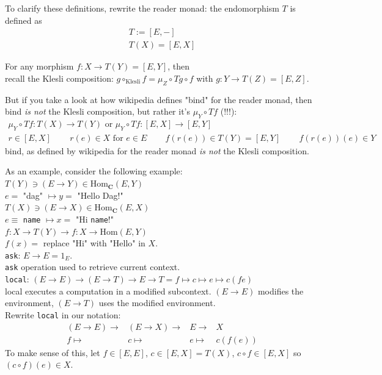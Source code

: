 To clarify these definitions, rewrite the reader monad: the endomorphism $T$ is defined as
\begin{equation}
\boxed{  \begin{aligned} & T := [E, -] \\ & T(X) = [E, X] \end{aligned} }
\end{equation}

For any morphism $f : X \to T(Y) = [E, Y]$, then \\
recall the Klesli composition: $g \circ_{\text{Klesli}} f = \mu_Z \circ Tg \circ f$ with $g: Y \to T(Z) = [E,Z]$. 

But if you take a look at how wikipedia defines "bind" for the reader monad, then bind \emph{is not} the Klesli composition, but rather it's $\mu_Y \circ Tf$ (!!!):
\begin{equation}
\begin{gathered}
\mu_Y \circ Tf: T(X) \to T(Y) \text{ or } \mu_Y \circ Tf : [E, X] \to [E, Y] \\ 
r \in [E,X] \qquad \, r(e) \in X \text{ for } e \in E \qquad \, f(r(e)) \in T(Y) = [E,Y] \qquad \, f(r(e))(e) \in Y
\end{gathered}
\end{equation}
bind, as defined by wikipedia for the reader monad \emph{is not} the Klesli composition.

As an example, consider the following example: \\
$T(Y) \ni (E\to Y) \in \text{Hom}_{\mathbf{C}}(E,Y)$ \\
$e = $ "dag" $\mapsto y = $ "Hello Dag!" \\

$T(X) \ni (E\to X) \in \text{Hom}_{\mathbf{C}}(E,X)$ \\
$e \equiv $ \texttt{name} $\mapsto x = $ "Hi \texttt{name}!" \\

$f:X\to T(Y) \to f:X\to \text{Hom}{(E,Y)}$ \\
$f(x) = $ replace "Hi" with "Hello" in $X$. \\

\texttt{ask}: $E\to E = 1_E$. \\
\texttt{ask} operation used to retrieve current context. \\

\texttt{local}: $(E\to E) \to (E\to T) \to E \to T = f \mapsto c \mapsto e \mapsto c(fe)$ \\
local executes a computation in a modified subcontext. $(E\to E)$ modifies the environment, $(E\to T)$ uses the modified environment. \\
Rewrite \texttt{local} in our notation: \\
\[
\begin{aligned} 
	& (E\to E) \to & (E\to X) \to & E \to & X \\
	& f \mapsto & c \mapsto & e \mapsto & c(f(e))
\end{aligned}
\]
To make sense of this, let $f \in [E, E]$, $c\in [E,X] = T(X)$, $c\circ f \in [E, X]$ so $(c\circ f)(e) \in X$. \\


